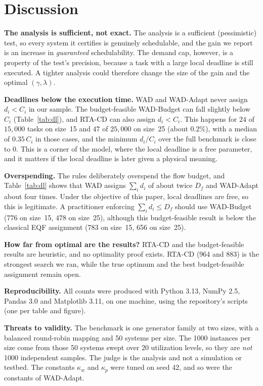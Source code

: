 \documentclass[conference]{IEEEtran}
\begin{document}
\section{Discussion}
\label{sec:discussion}

\smallskip\noindent\textbf{The analysis is sufficient, not exact.} The analysis is
a sufficient (pessimistic) test, so every system it certifies is genuinely
schedulable, and the gain we report is an increase in \emph{guaranteed}
schedulability. The demand cap, however, is a property of the test's precision,
because a task with a large local deadline is still executed. A tighter analysis
could therefore change the size of the gain and the optimal $(\gamma,\lambda)$.

\smallskip\noindent\textbf{Deadlines below the execution time.} WAD and WAD-Adapt
never assign $d_i<C_i$ in our sample. The budget-feasible WAD-Budget can fall
slightly below $C_i$ (Table~\ref{tab:dl}), and RTA-CD can also assign $d_i<C_i$.
This happens for $24$ of $15{,}000$ tasks on size~15 and $47$ of $25{,}000$ on
size~25 (about $0.2\%$), with a median of $0.35\,C_i$ in those cases, and the
minimum $d_i/C_i$ over the full benchmark is close to $0$. This is a corner of the
model, where the local deadline is a free parameter, and it matters if the local
deadline is later given a physical meaning.

\smallskip\noindent\textbf{Overspending.} The rules deliberately overspend the
flow budget, and Table~\ref{tab:dl} shows that WAD assigns $\sum_i d_i$ of about
twice $D_f$ and WAD-Adapt about four times. Under the objective of this paper,
local deadlines are free, so this is legitimate. A practitioner enforcing
$\sum_i d_i\le D_f$ should use WAD-Budget (776 on size~15, 478 on size~25),
although this budget-feasible result is below the classical EQF assignment (783 on
size~15, 656 on size~25).

\smallskip\noindent\textbf{How far from optimal are the results?} RTA-CD and the
budget-feasible results are heuristic, and no optimality proof exists. RTA-CD (964
and 883) is the strongest search we ran, while the true optimum and the best
budget-feasible assignment remain open.

\smallskip\noindent\textbf{Reproducibility.} All counts were produced with Python
3.13, NumPy 2.5, Pandas 3.0 and Matplotlib 3.11, on one machine, using the
repository's scripts (one per table and figure).

\smallskip\noindent\textbf{Threats to validity.} The benchmark is one generator
family at two sizes, with a balanced round-robin mapping and 50 systems per size.
The 1000 instances per size come from those 50 systems swept over 20 utilization
levels, so they are \emph{not} 1000 independent samples. The judge is the
analysis and not a simulation or testbed. The constants $\kappa_w$ and $\kappa_p$
were tuned on seed 42, and so were the constants of WAD-Adapt.
\end{document}
